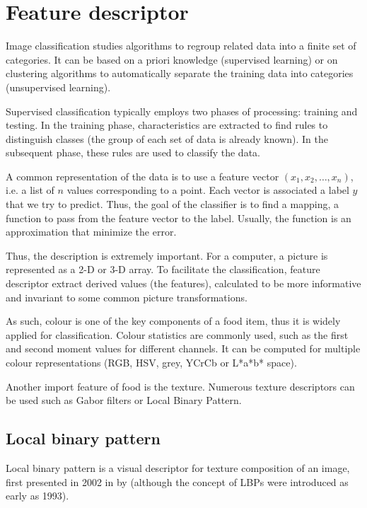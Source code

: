 \chapter{Feature descriptor} \label{sec:feature_descriptor}

Image classification studies algorithms to regroup related data into a finite set of categories. It can be based on a priori knowledge (supervised learning) or on clustering algorithms to automatically separate the training data into categories (unsupervised learning).

Supervised classification typically employs two phases of processing: training and testing. In the training phase, characteristics are extracted to find rules to distinguish classes (the group of each set of data is already known). In the subsequent phase, these rules are used to classify the data.

A common representation of the data is to use a feature vector $(x_1, x_2, \ldots, x_n)$, i.e. a list of $n$ values corresponding to a point. Each vector is associated a label $y$ that we try to predict. Thus, the goal of the classifier is to find a mapping, a function to pass from the feature vector to the label. Usually, the function is an approximation that minimize the error.

Thus, the description is extremely important. For a computer, a picture is represented as a 2-D or 3-D array. To facilitate the classification, feature descriptor extract derived values (the features), calculated to be more informative and invariant to some common picture transformations.

As such, colour is one of the key components of a food item, thus it is widely applied for classification. Colour statistics are commonly used, such as the first and second moment values for different channels. It can be computed for multiple colour representations (RGB, HSV, grey, YCrCb or L*a*b* space).

Another import feature of food is the texture. Numerous texture descriptors can be used such as Gabor filters or Local Binary Pattern.

\section{Local binary pattern}


Local binary pattern is a visual descriptor for texture composition of an image, first presented in 2002 in \cite{Ojala2002} by  (although the concept of LBPs were introduced as early as 1993).

